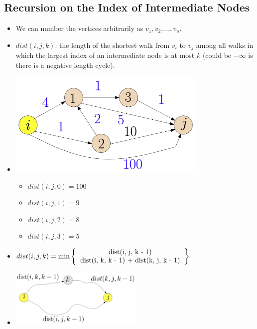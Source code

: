 \subsection{Recursion on the Index of Intermediate Nodes}
\begin{itemize}
    \item We can number the vertices arbitrarily as $v_1, v_2, ..., v_n$.
    \item $dist(i, j, k)$: the length of the shortest walk from $v_i$ to $v_j$ among all walks in which the largest index of an intermediate node is at most $k$ (could be $-\infty$ is there is a negative length cycle).
    \item[] \begin{center}
        \includegraphics[width=0.75\textwidth]{lecture20/images/all-pairs-dist-example.jpg}
    \end{center}
    \begin{itemize}
        \item $dist(i, j, 0) = 100$
        \item $dist(i, j, 1) = 9$
        \item $dist(i, j, 2) = 8$
        \item $dist(i, j, 3) = 5$
    \end{itemize}
    \item $dist(i, j, k) = \min \left\{
        \begin{tabular}{c}
            dist(i, j, k - 1) \\
            dist(i, k, k - 1) + dist(k, j, k - 1) \\
        \end{tabular}
    \right\}$
    \item[] \begin{center}
        \includegraphics[width=0.5\textwidth]{lecture20/images/all-pairs-recursive-example.jpg}

\end{center}
\end{itemize}
